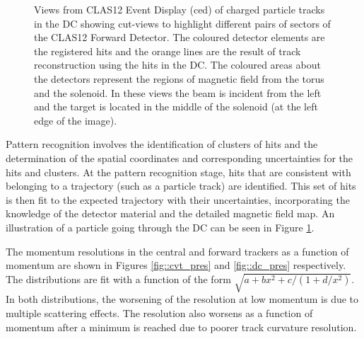     \begin{figure}[t]
        \centering{}
        \caption[Particle going through DC.]{Views from CLAS12 Event Display (ced) of charged particle tracks in the DC showing cut-views to highlight different pairs of sectors of the CLAS12 Forward Detector.
        The coloured detector elements are the registered hits and the orange lines are the result of track reconstruction using the hits in the DC.
        The coloured areas about the detectors represent the regions of magnetic field from the torus and the solenoid.
        In these views the beam is incident from the left and the target is located in the middle of the solenoid (at the left edge of the image).}
        \label{fig::ced_event}
    \end{figure}

    Pattern recognition involves the identification of clusters of hits and the determination of the spatial coordinates and corresponding uncertainties for the hits and clusters.
    At the pattern recognition stage, hits that are consistent with belonging to a trajectory (such as a particle track) are identified.
    This set of hits is then fit to the expected trajectory with their uncertainties, incorporating the knowledge of the detector material and the detailed magnetic field map.
    An illustration of a particle going through the DC can be seen in Figure \ref{fig::ced_event}.

    The momentum resolutions in the central and forward trackers as a function of momentum are shown in Figures \ref{fig::cvt_pres} and \ref{fig::dc_pres} respectively.
    The distributions are fit with a function of the form $\sqrt{a + bx^2 + c/(1 + d/x^2)}$.
    In both distributions, the worsening of the resolution at low momentum is due to multiple scattering effects.
    The resolution also worsens as a function of momentum after a minimum is reached due to poorer track curvature resolution.

